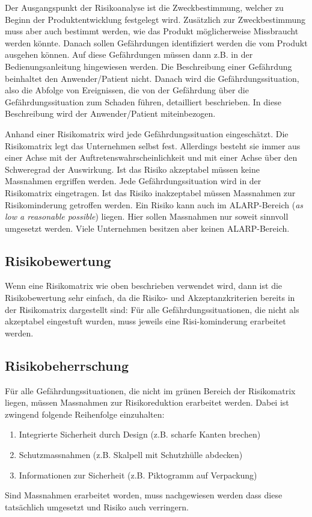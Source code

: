 Der Ausgangspunkt der Risikoanalyse ist die Zweckbestimmung, welcher zu Beginn der Produktentwicklung festgelegt wird. Zusätzlich zur Zweckbestimmung muss aber auch bestimmt werden, wie das Produkt möglicherweise Missbraucht werden könnte. Danach sollen Gefährdungen identifiziert werden die vom Produkt ausgehen können. Auf diese Gefährdungen müssen dann z.B. in der Bedienungsanleitung hingewiesen werden. Die Beschreibung einer Gefährdung beinhaltet den Anwender/Patient nicht. Danach wird die Gefährdungssituation, also die Abfolge von Ereignissen, die von der Gefährdung über die Gefährdungssituation zum Schaden führen, detailliert beschrieben. In diese Beschreibung wird der Anwender/Patient miteinbezogen.

Anhand einer Risikomatrix wird jede Gefährdungssituation eingeschätzt. Die Risikomatrix legt das Unternehmen selbst fest. Allerdings besteht sie immer aus einer Achse mit der Auftretenswahrscheinlichkeit und mit einer Achse über den Schweregrad der Auswirkung. Ist das Risiko akzeptabel müssen keine Massnahmen ergriffen werden. Jede Gefährdungssituation wird in der Risikomatrix eingetragen. Ist das Risiko inakzeptabel müssen Massnahmen zur Risikominderung getroffen werden. Ein Risiko kann auch im ALARP-Bereich (\textit{as low a reasonable possible}) liegen. Hier sollen Massnahmen nur soweit sinnvoll umgesetzt werden. Viele Unternehmen besitzen aber keinen ALARP-Bereich.

\subsection{Risikobewertung}

Wenn eine Risikomatrix wie oben beschrieben verwendet wird, dann ist die Risikobewertung sehr einfach, da die Risiko- und Akzeptanzkriterien bereits in der Risikomatrix dargestellt sind: Für alle Gefährdungssituationen, die nicht als akzeptabel eingestuft wurden, muss jeweils eine Risi-kominderung erarbeitet werden.

\subsection{Risikobeherrschung}

Für alle Gefährdungssituationen, die nicht im grünen Bereich der Risikomatrix liegen, müssen Massnahmen zur Risikoreduktion erarbeitet werden. Dabei ist zwingend folgende Reihenfolge einzuhalten:
\begin{enumerate}
	\item Integrierte Sicherheit durch Design (z.B. scharfe Kanten brechen)
	\item Schutzmassnahmen (z.B. Skalpell mit Schutzhülle abdecken)
	\item Informationen zur Sicherheit (z.B. Piktogramm auf Verpackung)
\end{enumerate}
Sind Massnahmen erarbeitet worden, muss nachgewiesen werden dass diese tatsächlich umgesetzt und Risiko auch verringern.

